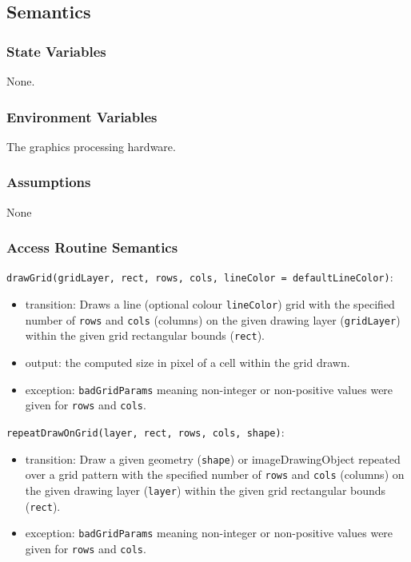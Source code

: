 \documentclass[12pt, titlepage]{article}
\newcommand{\code}[1]{\texttt{#1}}
\begin{document}
\subsection{Semantics}

\subsubsection{State Variables}
None.

\subsubsection{Environment Variables}
The graphics processing hardware.

\subsubsection{Assumptions}
None

\subsubsection{Access Routine Semantics}

\noindent \code{drawGrid(gridLayer, rect, rows, cols, lineColor = defaultLineColor)}:
\begin{itemize}
\item transition: Draws a line (optional colour \code{lineColor}) grid with the specified
  number of \code{rows} and \code{cols} (columns) on the given drawing layer (\code{gridLayer})
  within the given grid rectangular bounds (\code{rect}).
\item output: the computed size in pixel of a cell within the grid drawn.
\item exception: \code{badGridParams} meaning non-integer or non-positive values were given for
  \code{rows} and \code{cols}.
\end{itemize}

\noindent \code{repeatDrawOnGrid(layer, rect, rows, cols, shape)}:
\begin{itemize}
\item transition: Draw a given geometry (\code{shape}) or imageDrawingObject repeated over a grid pattern
  with the specified number of \code{rows} and \code{cols} (columns) on the given drawing
  layer (\code{layer}) within the given grid rectangular bounds (\code{rect}).
\item exception: \code{badGridParams} meaning non-integer or non-positive values were given for
  \code{rows} and \code{cols}.
\end{itemize}
\end{document}
